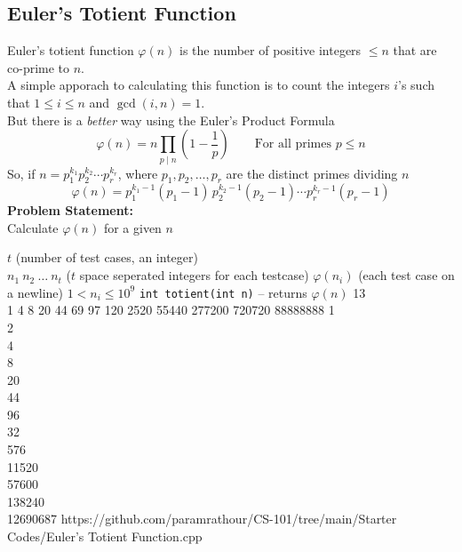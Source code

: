 \subsection{Euler's Totient Function}\label{pp:eulertotient}
Euler's totient function $\varphi(n)$ is the number of positive integers $\leq n$ that are co-prime to $n$.\\
A simple apporach to calculating this function is to count the integers $i$'s such that $1\leq i\leq n$ and $\gcd(i,n) = 1$.\\
But there is a \emph{better} way using the Euler's Product Formula
\begin{equation}
	\varphi (n)=n\prod _{p\mid n}\left(1-{\frac {1}{p}}\right)\qquad\text{For all primes $p\leq n$}
\end{equation}
So, if  ${\displaystyle n=p_{1}^{k_{1}}p_{2}^{k_{2}}\cdots p_{r}^{k_{r}}}$, where ${\displaystyle p_{1},p_{2},\ldots ,p_{r}}$ are the distinct primes dividing $n$
\begin{equation*}
	{\displaystyle \varphi (n)=p_{1}^{k_{1}-1}(p_{1}{-}1)\,p_{2}^{k_{2}-1}(p_{2}{-}1)\cdots p_{r}^{k_{r}-1}(p_{r}{-}1)}
\end{equation*}
\textbf{Problem Statement:}\\
Calculate $\varphi(n)$ for a given $n$

\begin{testcasesFunction}
	{$t$ \hfill(number of test cases, an integer)\\
	$n_1\ n_2\ \ldots\ n_t$ \hfill($t$ space seperated integers for each testcase)}
	{$\varphi(n_i)$ \hfill(each test case on a newline)}
	{$1 < n_i \leq 10^{9}$}
	{\texttt{int totient(int n)} -- returns $\varphi(n)$}
	{13\\1 4 8 20 44 69 97 120 2520 55440 277200 720720 88888888}
	{1\\2\\4\\8\\20\\44\\96\\32\\576\\11520\\57600\\138240\\12690687}
	{https://github.com/paramrathour/CS-101/tree/main/Starter Codes/Euler's Totient Function.cpp}
\end{testcasesFunction}